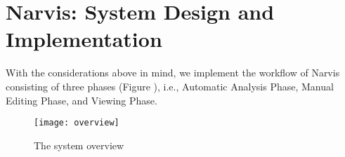 
\section{Narvis: System Design and Implementation}


With the considerations above in mind, we implement the workflow of Narvis consisting of three phases (Figure ), i.e., Automatic Analysis Phase, Manual Editing Phase, and Viewing Phase.


\begin{figure}
 \centering %
 \texttt{[image: overview]}
 \caption{The system overview}
 \label{fig:overview}
\end{figure}





